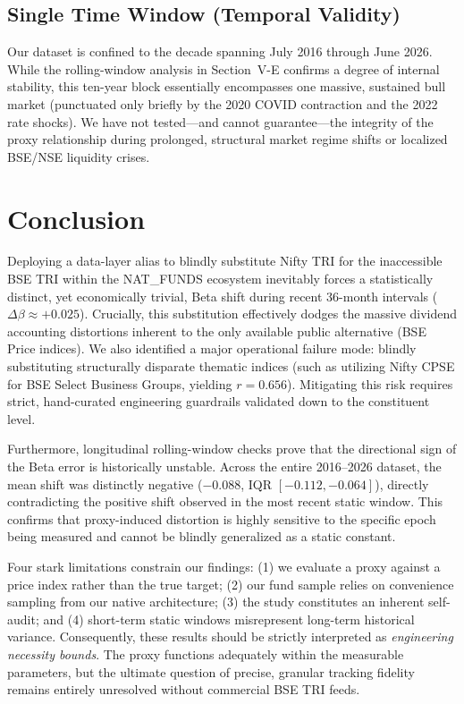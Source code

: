 \documentclass[conference]{IEEEtran}
\begin{document}
\subsection{Single Time Window (Temporal Validity)}
Our dataset is confined to the decade spanning July 2016 through June 2026. While the rolling-window analysis in Section~V-E confirms a degree of internal stability, this ten-year block essentially encompasses one massive, sustained bull market (punctuated only briefly by the 2020 COVID contraction and the 2022 rate shocks). We have not tested---and cannot guarantee---the integrity of the proxy relationship during prolonged, structural market regime shifts or localized BSE/NSE liquidity crises.

\section{Conclusion}

Deploying a data-layer alias to blindly substitute Nifty TRI for the inaccessible BSE TRI within the NAT\_FUNDS ecosystem inevitably forces a statistically distinct, yet economically trivial, Beta shift during recent 36-month intervals ($\Delta\beta\approx+0.025$). Crucially, this substitution effectively dodges the massive dividend accounting distortions inherent to the only available public alternative (BSE Price indices). We also identified a major operational failure mode: blindly substituting structurally disparate thematic indices (such as utilizing Nifty CPSE for BSE Select Business Groups, yielding $r=0.656$). Mitigating this risk requires strict, hand-curated engineering guardrails validated down to the constituent level.

Furthermore, longitudinal rolling-window checks prove that the directional sign of the Beta error is historically unstable. Across the entire 2016--2026 dataset, the mean shift was distinctly negative ($-0.088$, IQR $[-0.112, -0.064]$), directly contradicting the positive shift observed in the most recent static window. This confirms that proxy-induced distortion is highly sensitive to the specific epoch being measured and cannot be blindly generalized as a static constant.

Four stark limitations constrain our findings: (1) we evaluate a proxy against a price index rather than the true target; (2) our fund sample relies on convenience sampling from our native architecture; (3) the study constitutes an inherent self-audit; and (4) short-term static windows misrepresent long-term historical variance. Consequently, these results should be strictly interpreted as \emph{engineering necessity bounds}. The proxy functions adequately within the measurable parameters, but the ultimate question of precise, granular tracking fidelity remains entirely unresolved without commercial BSE TRI feeds.
\end{document}
